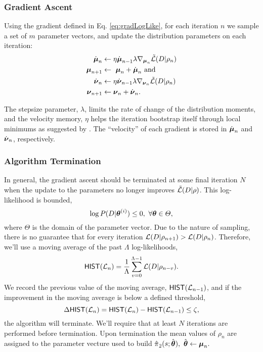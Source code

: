 \subsubsection{Gradient Ascent}

    Using the gradient defined in Eq. \ref{eq:gradLogLike}, for each iteration $n$ we sample a set of $m$ parameter
    vectors, and update the distribution parameters on each iteration:
    \begin{equation}\label{eq:gradient_update}
        \begin{aligned}
            \dot{\boldsymbol{\mathbb{\mu}}}_n & \leftarrow \eta\dot{\boldsymbol{\mathbb{\mu}}}_{n-1} \lambda\nabla_{\boldsymbol{\mathbb{\mu}}_n}
                                    \tilde{\mathcal{L}}(D|\rho_n)\\
            \boldsymbol{\mathbb{\mu}}_{n+1} & \leftarrow\ \boldsymbol{\mathbb{\mu}}_n + \dot{\boldsymbol{\mathbb{\mu}}}_n\ \text{and}\\
            \dot{\boldsymbol{\mathbb{\nu}}}_n & \leftarrow \eta\dot{\boldsymbol{\mathbb{\nu}}}_{n-1} \lambda\nabla_{\boldsymbol{\mathbb{\nu}}_n}
                                    \tilde{\mathcal{L}}(D|\rho_n)\\
            \boldsymbol{\mathbb{\nu}}_{n+1} & \leftarrow \boldsymbol{\mathbb{\nu}}_n + \dot{\boldsymbol{\mathbb{\nu}}}_n.
        \end{aligned}
    \end{equation}

    \noindent
    The stepsize parameter, $\lambda$, limits the rate of change of the distribution moments, and the velocity memory,
    $\eta$ helps the iteration bootstrap itself through local minimums as suggested by \cite{kingma2014adam}. The ``velocity'' of each gradient is stored in
    $\dot{\boldsymbol{\mathbb{\mu}}}_n$ and $\dot{\boldsymbol{\mathbb{\nu}}}_n$, respectively.

\subsubsection{Algorithm Termination}\label{sec:policy_infer_terminate}

    In general, the gradient ascent should be terminated at some final iteration $N$ when the update to the parameters
    no longer improves
    $\tilde{\mathcal{L}}(D|\rho)$. This log-likelihood is bounded,
    \[
    \log P(D|\boldsymbol{\mathbb{\theta}}^{(i)}) \leq 0,\  \forall \boldsymbol{\mathbb{\theta}} \in \varTheta,
    \]
    where $\varTheta$ is the domain of the parameter vector. Due to the nature of sampling, there is no guarantee that
    for every iteration $\mathcal{L}(D|\rho_{n+1})> \mathcal{L}(D|\rho_n)$. Therefore, we'll use a moving average of the past
    $\Lambda$ log-likelihoods,
    \[
    \mathsf{HIST}(\mathcal{L}_n)=\frac{1}{\Lambda}\sum_{v=0}^{\Lambda-1}\mathcal{L}(D|\rho_{n-v}).
    \]
    We record the previous value of the moving average, $\mathsf{HIST}(\mathcal{L}_{n-1})$, and if the improvement in the
    moving average is below a defined threshold,
    \[
    \Delta\mathsf{HIST}(\mathcal{L}_n) = \mathsf{HIST}(\mathcal{L}_n) - \mathsf{HIST}(\mathcal{L}_{n-1}) \leq \zeta,
    \]
    the algorithm will terminate. We'll require that at least $N$ iterations are performed before termination. Upon
    termination the mean values of $\rho_{n}$ are assigned to the parameter vecture used to build
    $\estimate{\policy{}}_{2}(s;\estimate{\paramVec}),\ \estimate{\paramVec} \leftarrow \vect{\mu}_n.$

